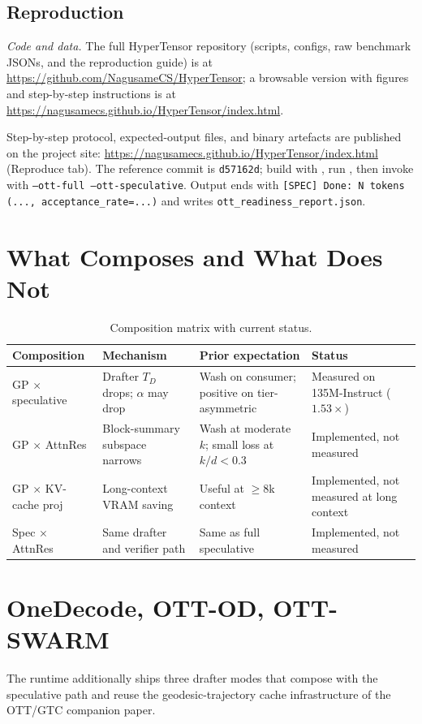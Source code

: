 \documentclass[11pt]{article}
\begin{document}
\subsection{Reproduction}
\smallskip\noindent\textit{Code and data.} The full HyperTensor repository (scripts, configs, raw benchmark JSONs, and the reproduction guide) is at \url{https://github.com/NagusameCS/HyperTensor}; a browsable version with figures and step-by-step instructions is at \url{https://nagusamecs.github.io/HyperTensor/index.html}.

Step-by-step protocol, expected-output files, and binary artefacts are
published on the project site:
\url{https://nagusamecs.github.io/HyperTensor/index.html} (Reproduce tab).
The reference commit is \texttt{d57162d}; build with
, run , then invoke
 with \texttt{--ott-full --ott-speculative}.
Output ends with \texttt{[SPEC] Done: N tokens (..., acceptance\_rate=...)}
and writes \texttt{ott\_readiness\_report.json}.

\section{What Composes and What Does Not}
\label{sec:compose}
\begin{table}[h]\centering\small
\caption{Composition matrix with current status.}
\begin{tabularx}{\textwidth}{@{}lXXl@{}}
\toprule
Composition & Mechanism & Prior expectation & Status \\
\midrule
GP $\times$ speculative   & Drafter $T_D$ drops; $\alpha$ may drop & Wash on consumer; positive on tier-asymmetric & Measured on 135M-Instruct ($1.53\times$) \\
GP $\times$ AttnRes       & Block-summary subspace narrows & Wash at moderate $k$; small loss at $k/d{<}0.3$ & Implemented, not measured \\
GP $\times$ KV-cache proj & Long-context VRAM saving & Useful at $\geq 8$k context & Implemented, not measured at long context \\
Spec $\times$ AttnRes     & Same drafter and verifier path & Same as full speculative & Implemented, not measured \\
\bottomrule
\end{tabularx}
\end{table}

\section{OneDecode, OTT-OD, OTT-SWARM}
\label{sec:ottmodes}
The runtime additionally ships three drafter modes that compose with the
speculative path and reuse the geodesic-trajectory cache infrastructure
of the OTT/GTC companion paper.
\end{document}
